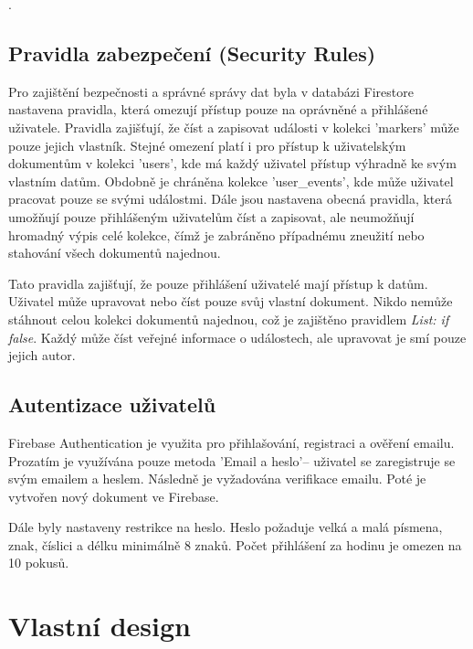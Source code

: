 .





\subsection{Pravidla zabezpečení (Security Rules)}

Pro zajištění bezpečnosti a správné správy dat byla v databázi Firestore nastavena pravidla, která omezují přístup pouze na oprávněné a přihlášené uživatele. Pravidla zajišťují, že číst a zapisovat události v kolekci 'markers' může pouze jejich vlastník. Stejné omezení platí i pro přístup k uživatelským dokumentům v kolekci 'users', kde má každý uživatel přístup výhradně ke svým vlastním datům. Obdobně je chráněna kolekce 'user\_events', kde může uživatel pracovat pouze se svými událostmi. Dále jsou nastavena obecná pravidla, která umožňují pouze přihlášeným uživatelům číst a zapisovat, ale neumožňují hromadný výpis celé kolekce, čímž je zabráněno případnému zneužití nebo stahování všech dokumentů najednou.

Tato pravidla zajišťují, že pouze přihlášení uživatelé mají přístup k datům. Uživatel může upravovat nebo číst pouze svůj vlastní dokument. Nikdo nemůže stáhnout celou kolekci dokumentů najednou, což je zajištěno pravidlem \textit{List: if false}. Každý může číst veřejné informace o událostech, ale upravovat je smí pouze jejich autor.

\cite{FirebaseDocs}



\subsection{Autentizace uživatelů}

Firebase Authentication je využita pro přihlašování, registraci a ověření emailu. Prozatím je využívána pouze metoda 'Email a heslo'– uživatel se zaregistruje se svým emailem a heslem. Následně je vyžadována verifikace emailu. Poté je vytvořen nový dokument ve Firebase.

Dále byly nastaveny restrikce na heslo. Heslo požaduje velká a malá písmena, znak, číslici a délku minimálně 8 znaků. Počet přihlášení za hodinu je omezen na 10 pokusů.
\cite{FirebaseDocs}






\section{Vlastní design}

